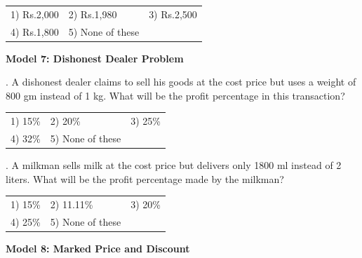 \documentclass{article}
\begin{document}
	\noindent 
	
	\noindent  
	\begin{tabular}{p{1.7in} p{1.6in} p{1.6in}} \\ 
 1) Rs.2,000              & 2) Rs.1,980       & 3) Rs.2,500       \\
4) Rs.1,800       & 5) None of these  \\
\end{tabular}
	
	\noindent 
	
	\noindent 
	
	\noindent 
	
	\noindent 
	
	\noindent \textbf{Model 7: Dishonest Dealer Problem}
	
	\noindent 
	
	. A dishonest dealer claims to sell his goods at the cost price but uses a weight of 800 gm instead of 1 kg. What will be the profit percentage in this transaction?
	
	\noindent  
	\begin{tabular}{p{1.7in} p{1.6in} p{1.6in}} \\ 
 1) 15\%                    & 2) 20\%              & 3) 25\%              \\
4) 32\%              & 5) None of these  \\
\end{tabular}
	
	\noindent 
	
	\noindent 
	
	\noindent 
	
	. A milkman sells milk at the cost price but delivers only 1800 ml instead of 2 liters. What will be the profit percentage made by the milkman?
	
	\noindent  
	\begin{tabular}{p{1.7in} p{1.6in} p{1.6in}} \\ 
 1) 15\%                    & 2) 11.11\%         & 3) 20\%              \\
4) 25\%              & 5) None of these  \\
\end{tabular}
	
	\noindent 
	
	\noindent 
	
	\noindent 
	
	\noindent 
	
	\noindent \textbf{Model 8: Marked Price and Discount}
	
\end{document}
